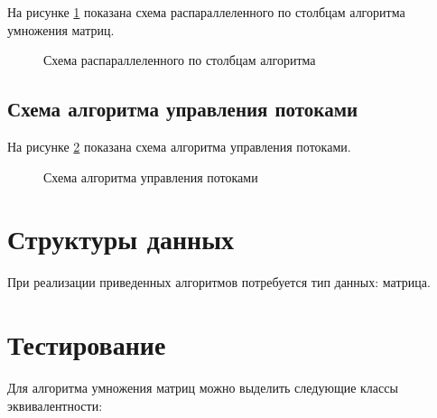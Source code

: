 На рисунке \ref{ris:schemaparcolumnav} показана схема распараллеленного по столбцам алгоритма умножения матриц.

\begin{figure}[H]
  \caption{Схема распараллеленного по столбцам алгоритма}
  \label{ris:schemaparcolumnav}
\end{figure}

\subsection{Схема алгоритма управления потоками}\label{SchemaTheardControl}

На рисунке \ref{ris:schemacontrolthread} показана схема алгоритма управления потоками.

\begin{figure}[H]
  \caption{Схема алгоритма управления потоками}
  \label{ris:schemacontrolthread}
\end{figure}






\section{Структуры данных}\label{Structs}

При реализации приведенных алгоритмов потребуется тип данных: матрица.

\section{Тестирование}\label{Testing}


Для алгоритма умножения матриц можно выделить следующие классы эквивалентности:

